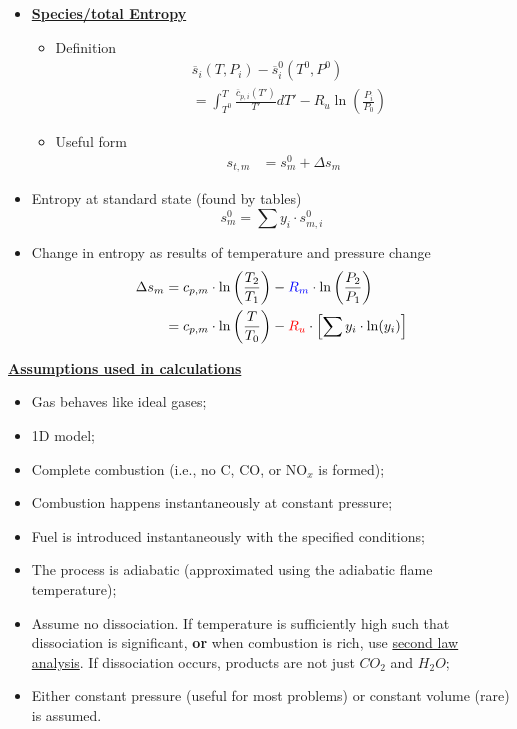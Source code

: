 \begin{itemize}
    \item {\color{blue}\textbf{\ul{Species/total Entropy}}}
    \begin{itemize}
        \item Definition
        \begin{align*}
            &\overline{s}_i (T, P_i) - \overline{s}^{0}_{i} (T^0 ,P^0 ) \\
            &= \int_{T^0}^{T} \frac{\overline{c}_{p,i}(T')}{T'} dT' - R_u \ln(\frac{P_i}{P_0})
        \end{align*}
        \item Useful form
        \begin{align*}
            s_{t,m} &= s_{m}^{0} + \Delta s_m
        \end{align*}
    \end{itemize}
    \item Entropy at standard state (found by tables)
    \begin{equation*}
        s_{m}^{0} = \sum y_i \cdot s_{m,i}^{0}
    \end{equation*}
    \item Change in entropy as results of temperature and pressure change
    \begin{align*}
        \Delta s_m &= c_{p,m} \cdot \ln\left(\frac{T_2}{T_1}\right) - {\color{blue}R_m} \cdot \ln\left(\frac{P_2}{P_1}\right)\\
        &= c_{p,m} \cdot \ln\left(\frac{T}{T_0}\right) - {\color{red}R_u} \cdot  \left[\sum y_i \cdot \ln(y_i)\right]
    \end{align*}
\end{itemize}

{\Large \textbf{{\color{blue}\underline{Assumptions used in calculations}}}}

\begin{itemize}
    \item Gas behaves like ideal gases;
    \item 1D model;
    \item Complete combustion (i.e., no C, CO, or $\text{NO}_x$ is formed);
    \item Combustion happens instantaneously at constant pressure;
    \item Fuel is introduced instantaneously with the specified conditions;
    \item The process is adiabatic (approximated using the adiabatic flame temperature);
    \item Assume no dissociation. If temperature is sufficiently high such that dissociation is significant, \textbf{or} when combustion is rich, use {\color{red}\ul{second law analysis}}. If dissociation occurs, products are not just $CO_2$ and $H_2 O$;
    \item Either constant pressure (useful for most problems) or constant volume (rare) is assumed.
\end{itemize}

